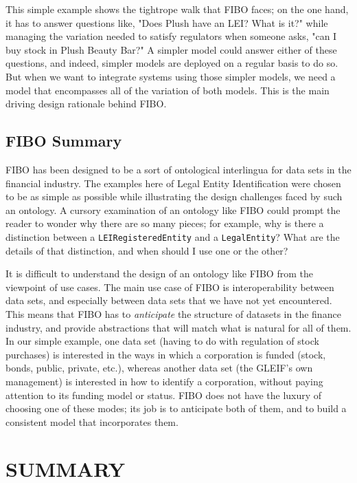 This simple example shows the tightrope walk that FIBO faces; 
on the one hand, it has to answer questions like, "Does Plush 
have an LEI?  What is it?"
while managing the variation needed to satisfy regulators 
when someone asks, "can I buy stock in Plush Beauty Bar?"  
A simpler model could answer
either of these questions, and indeed, simpler models are 
deployed on a regular basis to do so.  But when we want to 
integrate systems using those
simpler models, we need a model that encompasses all of the variation
of both models.  This is the main driving design rationale behind FIBO. 

\subsection{FIBO Summary}

FIBO has been designed to be a sort of ontological interlingua for 
data sets in the financial industry.  The examples here of Legal 
Entity Identification were chosen to be as simple as possible 
while illustrating the design challenges faced by such an ontology. 
A cursory examination of an ontology like FIBO could prompt 
the reader to wonder why there are so many pieces; for example, 
why is there 
a distinction between a \texttt{LEIRegisteredEntity} and a
\texttt{LegalEntity}?  What are the details of that distinction, and when
should 
I use one or the other? 

It is difficult to understand the design of an ontology like FIBO from the
viewpoint of use cases.  The main use case of FIBO is interoperability 
between data sets, and especially between data sets that we have not yet
encountered.  This means that FIBO has to \emph{anticipate} the structure of 
datasets in the finance industry, and provide abstractions that will match what
is natural for all of them.  In our simple example, one data
set (having to do with regulation of stock purchases) is interested in the ways
in which a corporation is funded (stock, bonds, public, private, etc.),
whereas another data set (the GLEIF's own management) is interested in how to
identify a corporation, without paying attention to its funding model
or status.  FIBO does not have the luxury of choosing one of these modes; its
job is to anticipate both of them, and to build a consistent 
model that incorporates them.


\section{SUMMARY}

